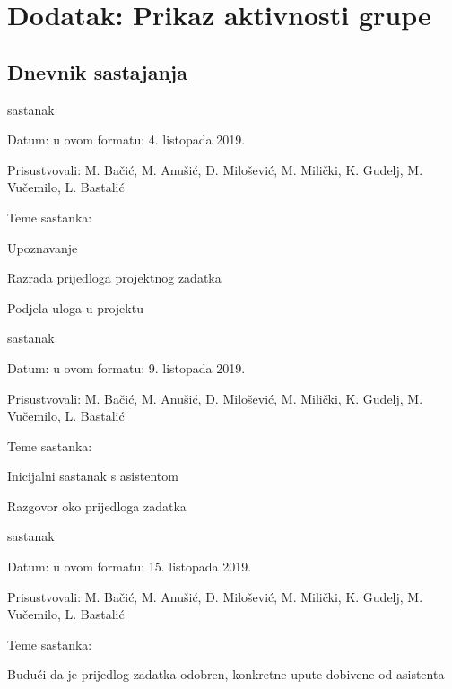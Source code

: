 \chapter*{Dodatak: Prikaz aktivnosti grupe}
		
		\section*{Dnevnik sastajanja}
		
		\begin{packed_enum}
			\item  sastanak
			
			\item[] \begin{packed_item}
				\item Datum: u ovom formatu: 4. listopada 2019.
				\item Prisustvovali: M. Bačić, M. Anušić, D. Milošević, M. Milički, K. Gudelj, M. Vučemilo, L. Bastalić
				\item Teme sastanka:
				\begin{packed_item}
					\item  Upoznavanje
					\item  Razrada prijedloga projektnog zadatka
					\item  Podjela uloga u projektu
				\end{packed_item}
			\end{packed_item}
			
			\item  sastanak
			\item[] \begin{packed_item}
				\item Datum: u ovom formatu: 9. listopada 2019.
				\item Prisustvovali: M. Bačić, M. Anušić, D. Milošević, M. Milički, K. Gudelj, M. Vučemilo, L. Bastalić
				\item Teme sastanka:
				\begin{packed_item}
					\item  Inicijalni sastanak s asistentom
					\item  Razgovor oko prijedloga zadatka
				\end{packed_item}
			\end{packed_item}
		
			\item  sastanak
			\item[] \begin{packed_item}
				\item Datum: u ovom formatu: 15. listopada 2019.
				\item Prisustvovali: M. Bačić, M. Anušić, D. Milošević, M. Milički, K. Gudelj, M. Vučemilo, L. Bastalić
				\item Teme sastanka:
				\begin{packed_item}
					\item  Budući da je prijedlog zadatka odobren, konkretne upute dobivene od asistenta
				\end{packed_item}
			\end{packed_item}
		

\end{packed_enum}
